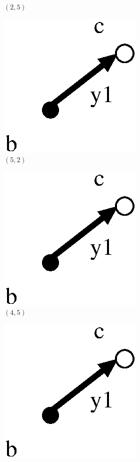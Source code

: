 \documentclass[a4paper,12pt]{article}
\numberwithin{equation}{section}
\numberwithin{figure}{section}
\begin{document}
\begin{figure}
\begin{center}
\begin{subfigure}[b]{.13\columnwidth}
\caption{$(2,5)$}
\label{fig:G2xG2-2-3}
\end{subfigure}
\hspace{1mm}
\begin{subfigure}[b]{.13\columnwidth}
\includegraphics[scale=.5]{G2xG2-2.eps}
\caption{$(5,2)$}
\label{fig:G2xG2-2-4}
\end{subfigure}
\hspace{1mm}
\begin{subfigure}[b]{.13\columnwidth}
\includegraphics[scale=.5]{G2xG2-2.eps}
\caption{$(4,5)$}
\label{fig:G2xG2-2-5}
\end{subfigure}
\hspace{1mm}
\begin{subfigure}[b]{.13\columnwidth}
\includegraphics[scale=.5]{G2xG2-2.eps}

\end{subfigure}
\end{center}
\end{figure}
\end{document}
